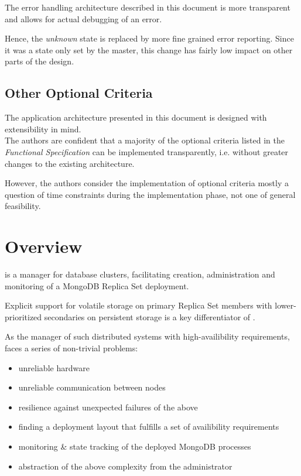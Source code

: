 The error handling architecture described in this document is more transparent and allows for actual debugging of an error.

Hence, the \emph{unknown} state is replaced by more fine grained error reporting.
Since it was a state only set by the master, this change has fairly low impact on other parts of the design.

\subsection{Other Optional Criteria}

The application architecture presented in this document is designed with extensibility in mind.\\
The authors are confident that a majority of the optional criteria listed in the \emph{Functional Specification} can be implemented
transparently, i.e. without greater changes to the existing architecture.

However, the authors consider the implementation of optional criteria mostly a question of time constraints during the
implementation phase, not one of general feasibility.

\section{Overview}

\mamid is a manager for database clusters, facilitating creation, administration and monitoring of a MongoDB Replica Set deployment.

Explicit support for volatile storage on primary Replica Set members with lower-prioritized secondaries on persistent
storage is a key differentiator of \mamid.

As the manager of such distributed systems with high-availibility requirements, \mamid faces a series of non-trivial problems:
\begin{itemize}
  \item unreliable hardware
  \item unreliable communication between nodes
  \item resilience against unexpected failures of the above 
  \item finding a deployment layout that fulfills a set of availibility requirements
  \item monitoring \& state tracking of the deployed MongoDB processes
  \item abstraction of the above complexity from the administrator
\end{itemize}

